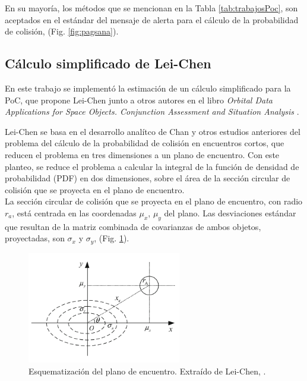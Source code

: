 En su mayor\'ia, los m\'etodos que se mencionan en la Tabla \ref{tab:trabajosPoc}, son aceptados en el est\'andar del mensaje de alerta para el c\'alculo de la probabilidad de colisi\'on, (Fig. \ref{fig:pagsana}).

% 
  

\subsection{C\'alculo simplificado de Lei-Chen}\label{subsec:pocsimp}

En este trabajo se implement\'o la estimaci\'on de un c\'alculo simplificado para la PoC, que propone Lei-Chen junto a otros autores en el libro 
{\it{Orbital Data Applications for Space Objects. Conjunction Assessment and Situation Analysis}} \citep{leichen}.

Lei-Chen se basa en el desarrollo anal\'itco de Chan \citep{chan2003improved} y otros estudios anteriores del problema del c\'alculo de la probabilidad de colisi\'on en encuentros cortos, que reducen el problema en tres dimensiones a un plano de encuentro.
Con este planteo, se reduce el problema a calcular la integral de la funci\'on de densidad de probabilidad (PDF) en dos dimensiones, sobre el \'area de la secci\'on circular de colisi\'on que se proyecta en el plano de encuentro.\\

La secci\'on circular de colisi\'on que se proyecta en el plano de encuentro, con radio $r_{a}$, est\'a centrada en las coordenadas $\mu_{x}$, $\mu_{y}$ del plano. Las desviaciones est\'andar que resultan de la matriz combinada de covarianzas de ambos objetos, proyectadas, son $\sigma_{x}$ y $\sigma_{y}$,  (Fig. \ref{fig:planoenc}).\\

\begin{figure}[!h]
\centering
\includegraphics[width=0.6\textwidth]{imagenes/planodeencuentro}
\caption[Plano de Encuentro]{Esquematizaci\'on del plano de encuentro. Extra\'ido de Lei-Chen, \citep{leichen}.}
\label{fig:planoenc}
\end{figure}


